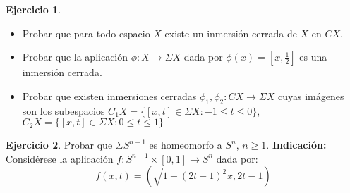 \documentclass{article}
\theoremstyle{plain}
\theoremstyle{definition}
\newtheorem{exercise}{Ejercicio}
\begin{document}
\newpage
\begin{exercise}\mbox{}
\begin{itemize}
	\item Probar que para todo espacio $X$ existe un inmersión cerrada de $X$ en $C X$.
	\item Probar que la aplicación $\phi : X \to \Sigma X$ dada por $\phi(x) = [x, \frac{1}{2}]$ es una inmersión cerrada.
	\item Probar que existen inmersiones cerradas $\phi_1, \phi_2 : C X \to \Sigma X$ cuyas imágenes son los subespacios $C_1 X = \{[x,t] \in \Sigma X : -1 \leq t \leq 0\}$, $C_2 X = \{[x,t] \in \Sigma X : 0 \leq t \leq 1\}$
\end{itemize}
\end{exercise}


\newpage
\begin{exercise}
Probar que $\Sigma S^{n-1}$ es homeomorfo a $S^n$, $n \geq 1$. \textbf{Indicación:} Considérese la aplicación $f : S^{n-1} \times [0,1] \to S^n$ dada por:
\[ f(x,t) = (\sqrt{1-(2t-1)^2}x, 2t-1) \]
\end{exercise}
\end{document}
